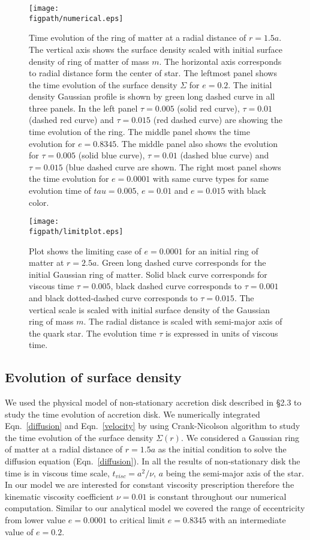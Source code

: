 \documentclass[useAMS,usenatbib]{mn2e}
\newcommand{\figpath}{./Figs/}
\begin{document}
\begin{figure*}
\centering
\texttt{[image: \\figpath/numerical.eps]}
\caption{\small{Time evolution of the ring of matter at a radial distance of $r = 1.5 a$. The vertical axis shows the surface density scaled with initial surface density of ring of matter of mass $m$. The horizontal axis corresponds to radial distance form the center of star. The leftmost panel shows the time evolution of the surface density $\Sigma$ for $e = 0.2$. The initial density Gaussian profile is shown by green long dashed curve in all three panels. In the left panel $\tau = 0.005$ (solid red curve), $\tau = 0.01$ (dashed red curve) and $\tau = 0.015$ (red dashed curve) are showing the time evolution of the ring. The middle panel shows the time evolution for $e = 0.8345$. The middle panel also shows the evolution for $\tau = 0.005$ (solid blue curve), $\tau = 0.01$ (dashed blue curve) and $\tau = 0.015$ (blue dashed curve are shown. The right most panel shows the time evolution for $e = 0.0001$ with same curve types for same evolution time of $tau = 0.005$, $e = 0.01$ and $e = 0.015$ with black color.}}
\label{evolve}
\end{figure*}
\begin{figure}
\centering
\texttt{[image: \\figpath/limitplot.eps]}
\caption{\small{Plot shows the limiting case of $e = 0.0001$ for an initial ring of matter at $r = 2.5a$. Green long dashed curve corresponds for the initial Gaussian ring of matter. Solid black curve corresponds for viscous time $\tau = 0.005$, black dashed curve corresponds to $\tau = 0.001$ and black dotted-dashed curve corresponds to $\tau = 0.015$. The vertical scale is scaled with initial surface density of the Gaussian ring of mass $m$. The radial distance is scaled with semi-major axis of the quark star. The evolution time $\tau$ is expressed in units of viscous time.}}
\label{limit}
\end{figure}
\subsection{Evolution of surface density}
We used the physical model of non-stationary accretion disk described in \S2.3 to study the time evolution of accretion disk. We numerically integrated Eqn.~\ref{diffusion} and Eqn.~\ref{velocity} by using Crank-Nicolson algorithm to study the time evolution of the surface density $\Sigma(r)$. We considered a Gaussian ring of matter at a radial distance of $r = 1.5a$ as the initial condition to solve the diffusion equation (Eqn.~\ref{diffusion}). In all the results of non-stationary disk the time is in viscous time scale, $t_{visc} = a^2/\nu$, $a$ being the semi-major axis of the star. In our model we are interested for constant viscosity prescription therefore the kinematic viscosity coefficient $\nu = 0.01$ is constant throughout our numerical computation. Similar to our analytical model we covered the range of eccentricity from lower value $e = 0.0001$ to critical limit $e = 0.8345$ with an intermediate value of $e = 0.2$. 
\end{document}
